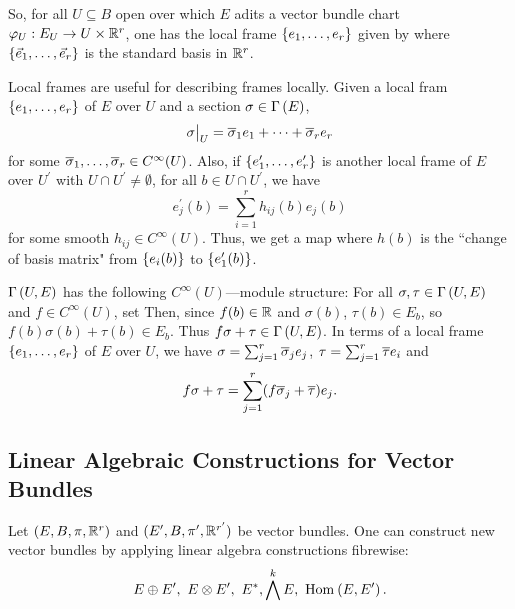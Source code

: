 \documentclass[main.tex]{subfiles}
\begin{document}
So, for all $U \subseteq B$ open over which $E$ adits a vector bundle chart $\varphi_U : E_U  \to U \times \mathbb{R}^r$, one has the local frame $\left\{e_1,\dots, e_r\right\}$ given by
where $\left\{\vec{e}_1, \dots, \vec{e}_r\right\}$ is the standard basis in $\mathbb{R}^r$.

Local frames are useful for describing frames locally. Given a local fram $\left\{e_1, \dots, e_r\right\}$ of $E$ over $U$ and a section $\sigma \in \Gamma\left( E \right)$,
\[
\sigma\big|_{U} = \overline{\sigma}_1 e_1 + \dots + \overline{\sigma}_r e_r
\]
for some $\overline{\sigma}_1, \dots, \overline{\sigma}_r \in C^\infty(U)$.
Also, if $\left\{e_1^\prime, \dots, e_r^\prime\right\}$ is another local frame of $E$ over $U^\prime$ with $U \cap U^\prime \neq \emptyset$, for all $b \in U \cap U^\prime$, we have
\[
    e_j^\prime(b) = \sum_{i=1}^r h_{ij}(b)e_j(b)
\] for some smooth $h_{ij} \in C^\infty(U)$. Thus, we get a map
 where $h(b)$ is the ``change of basis matrix" from $\left\{e_i(b)\right\}$ to $\left\{e_1^\prime(b)\right\}$.

\begin{note}
$\Gamma\left( U, E \right)$ has the following $C^\infty(U)$---module structure: For all $\sigma, \tau \in \Gamma\left( U, E \right)$ and $f \in C^\infty(U)$, set
Then, since $f(b) \in \mathbb{R}$ and $\sigma(b)$, $\tau(b) \in E_b$, so $f(b)\sigma(b) + \tau(b) \in E_b$. Thus $f\sigma + \tau \in \Gamma\left( U, E \right)$. In terms of a local frame $\left\{e_1, \dots, e_r\right\}$ of $E$ over $U$, we have $\sigma = \sum_{j=1}^r \overline{\sigma}_je_j$, $\tau = \sum_{j=1}^r \overline{\tau} e_i$ and
\[
f \sigma + \tau = \sum_{j=1}^r (f\overline{\sigma}_j + \overline{\tau})e_j.
\]
\end{note}

\subsection{Linear Algebraic Constructions for Vector Bundles}

Let $(E, B , \pi, \mathbb{R}^r)$ and $(E^\prime, B, \pi^\prime, \mathbb{R}^{r^\prime})$ be vector bundles. One can construct new vector bundles by applying linear algebra constructions fibrewise:
\[
E \oplus E^\prime, \ E \otimes E^\prime, \ E^*, \bigwedge^k E, \ \text{Hom}_{}\left( E, E^\prime \right).
\]
\end{document}

